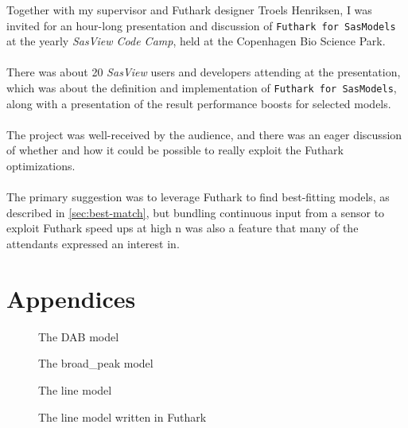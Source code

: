 \documentclass[11pt]{article}
\newcommand{\sasview}{\textit{SasView}}
\newcommand{\futhark}{\texttt{Futhark for SasModels}}
\begin{document}
\begin{mdframed}[
  frametitle={Presentation at \sasview{} Code Camp},
  nobreak=true
  ]
Together with my supervisor and Futhark designer Troels Henriksen,
I was invited for an hour-long presentation and discussion of \futhark{} at the
yearly \textit{SasView Code Camp}, held at the Copenhagen Bio Science Park.\\\\
There was about 20 \sasview{} users and developers attending at the presentation,
which was about the definition and implementation of \futhark{}, along with
a presentation of the result performance boosts for selected models.\\\\
The project was well-received by the audience, and there was an eager discussion
of whether and how it could be possible to really exploit the Futhark
optimizations.\\\\
The primary suggestion was to leverage Futhark to find best-fitting models,
as described in \ref{sec:best-match}, but bundling continuous input from
a sensor to exploit Futhark speed ups at high n was also a feature that many
of the attendants expressed an interest in.
\end{mdframed}



\section*{Appendices}

\begin{figure}
  
  \label{fig:dabmodel}
  \caption{The DAB model}
\end{figure}

\begin{figure}
  
  \label{fig:broadpeakmodel}
  \caption{The broad_peak model}
\end{figure}

\begin{figure}
  
  \label{fig:linemodel}
  \caption{The line model}
\end{figure}

\begin{figure}
  
  \label{fig:linemodel-futhark}
  \caption{The line model written in Futhark}
\end{figure}
\end{document}
